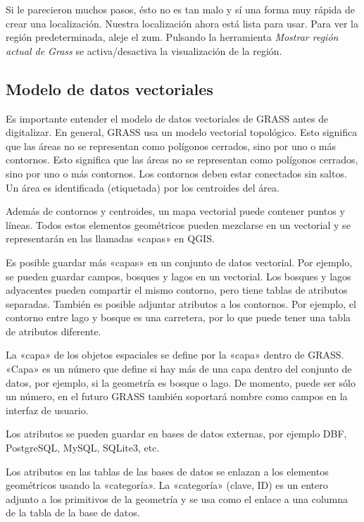 Si le parecieron muchos pasos, ésto no es tan malo y sí una forma muy rápida de crear una localización. Nuestra localización ahora está lista para usar. Para ver la región predeterminada, aleje el zum. Pulsando la herramienta \textsl{Mostrar región actual de Grass} se activa/desactiva la visualización de la región.

\subsection{Modelo de datos vectoriales}\label{label_vectmodel}

Es importante entender el modelo de datos vectoriales de GRASS antes de digitalizar. En general, GRASS usa un modelo vectorial topológico. Esto significa que las áreas no se representan como polígonos cerrados, sino por uno o más contornos. Esto significa que las áreas no se representan como polígonos cerrados, sino por uno o más contornos. Los contornos deben estar conectados sin saltos. Un área es identificada (etiquetada) por los centroides del área.

Además de contornos y centroides, un mapa vectorial puede contener puntos y líneas. Todos estos elementos geométricos pueden mezclarse en un vectorial y se representarán en las llamadas «capas» en QGIS.

Es posible guardar más «capas» en un conjunto de datos vectorial. Por ejemplo, se pueden guardar campos, bosques y lagos en un vectorial. Los bosques y lagos adyacentes pueden compartir el mismo contorno, pero tiene tablas de atributos separadas. También es posible adjuntar atributos a los contornos. Por ejemplo, el contorno entre lago y bosque es una carretera, por lo que puede tener una tabla de atributos diferente.

La «capa» de los objetos espaciales se define por la «capa» dentro de GRASS. «Capa» es un número que define si hay más de una capa dentro del conjunto de datos, por ejemplo, si la geometría es bosque o lago. De momento, puede ser sólo un número, en el futuro GRASS también soportará nombre como campos en la interfaz de usuario.

Los atributos se pueden guardar en bases de datos externas, por ejemplo DBF, PostgreSQL, MySQL, SQLite3, etc.

Los atributos en las tablas de las bases de datos se enlazan a los elementos geométricos usando la «categoría». La «categoría» (clave, ID) es un entero adjunto a los primitivos de la geometría y se usa como el enlace a una columna de la tabla de la base de datos.

